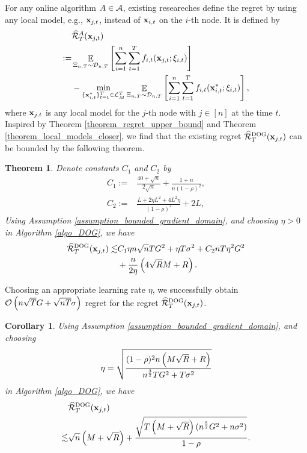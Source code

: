 \documentclass{article}
\def\rc{\color {red}}
\newtheorem{Theorem}{\bf{Theorem}}
\newtheorem{Corollary}{\bf{Corollary}}
\begin{document}
{\rc 
For any online algorithm $A\in{\mathcal{A}}$, existing researeches \citep{pmlr-v70-zhang17g} define the regret by using any local model, e.g., ${\bf x}_{j,t}$, instead of ${\bf x}_{i,t}$ on the $i$-th node. It is defined by 
\begin{align}
\label{equa_define_other_regret}
& \widehat{{\mathcal{R}}}_T^{A}({\bf x}_{j,t}) \\ \nonumber
:= & \mathop{\mathbb{E}}_{\Xi_{n,T} \sim \mathcal{D}_{n,T}}\left [\sum_{i=1}^n \sum_{t=1}^T f_{i,t}({\bf x}_{j,t};\xi_{i,t})\right ] \\ \nonumber
& - \min_{\{{\bf x}_{i,t}^\ast\}_{t=1}^T \in {\mathcal{L}}_M^T} \mathop{\mathbb{E}}_{\Xi_{n,T} \sim \mathcal{D}_{n,T}} \left [\sum_{i=1}^n \sum_{t=1}^T f_{i,t}({\bf x}_{i,t}^\ast;\xi_{i,t})\right ],
\end{align} 
where ${\bf x}_{j,t}$ is any local model for the $j$-th node with $j\in[n]$ at the time $t$. Inspired by Theorem \ref{theorem_regret_upper_bound} and Theorem \ref{theorem_local_models_closer}, we find that the existing regret $\widehat{{\mathcal{R}}}_T^{\textsc{DOG}}({\bf x}_{j,t})$ can be bounded by the following theorem.
\begin{Theorem}
\label{theorem_implied_other_regret_bound}
Denote constants $C_1$ and $C_2$ by
\begin{align}
\nonumber
C_1 := & \frac{40+\sqrt{n}}{2\sqrt{n}} + \frac{1+n}{n(1-\rho)^2}, \\ \nonumber
C_2 := & \frac{L + 2\eta L^2  + 4L^2 \eta}{(1-\rho)^2} +2L,
\end{align}  Using Assumption \ref{assumption_bounded_gradient_domain}, and choosing $\eta>0$ in Algorithm \ref{algo_DOG}, we have
\begin{align}
\nonumber
\widehat{{\mathcal{R}}}_T^{\textsc{DOG}}({\bf x}_{j,t}) \lesssim & C_1 \eta n\sqrt{n} T G^2 +\eta T\sigma^2 + C_2  nT\eta^2 G^2  \\ \nonumber
&  + \frac{n}{2\eta}\left(  4\sqrt{R}M + R   \right).
\end{align}
\end{Theorem} Choosing an appropriate learning rate $\eta$, we successfully obtain ${\mathcal{O}\left( n\sqrt{T}G + \sqrt{nT}\sigma \right)}$ regret for the regret $\widehat{{\mathcal{R}}}_T^{\textsc{DOG}}({\bf x}_{j,t})$.
\begin{Corollary}
\label{corollary_implied_other_regret_bound}
Using Assumption \ref{assumption_bounded_gradient_domain}, and choosing 
\begin{align}
\nonumber
\eta = \sqrt{\frac{(1-\rho)^2 n\left( M\sqrt{R} + R \right)}{ n^{\frac{3}{2}}TG^2 + T\sigma^2 }}
\end{align} in Algorithm \ref{algo_DOG}, we have
\begin{align}
\nonumber
& \widehat{{\mathcal{R}}}_T^{\textsc{DOG}}({\bf x}_{j,t}) \\ \nonumber
\lesssim & \sqrt{n}\left( M+\sqrt{R} \right) + \frac{\sqrt{T\left( M+\sqrt{R} \right)(n^\frac{5}{2}G^2 + n\sigma^2)}}{1-\rho}.
\end{align}
\end{Corollary} 

}
\end{document}
